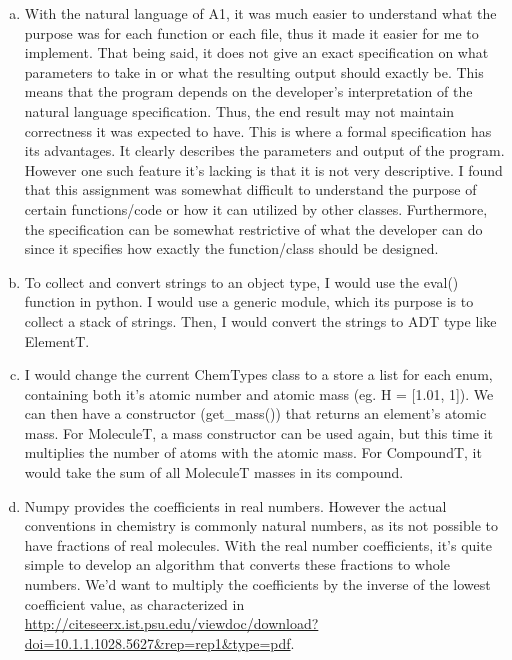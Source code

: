 \documentclass[12pt]{article}
\begin{document}
\begin{enumerate}[a)]

\item
With the natural language of A1, it was much easier to understand what the purpose was for each function or each file, thus it made it easier for me to implement. That being said, it does not give an exact specification on what parameters to take in or what the resulting output should exactly be. This means that the program depends on the developer's interpretation of the natural language specification. Thus, the end result may not maintain correctness it was expected to have. 
\newline
This is where a formal specification has its advantages. It clearly describes the parameters and output of the program. However one such feature it's lacking is that it is not very descriptive. I found that this assignment was somewhat difficult to understand the purpose of certain functions/code or how it can utilized by other classes. Furthermore, the specification can be somewhat restrictive of what the developer can do since it specifies how exactly the function/class should be designed.   

\item
To collect and convert strings to an object type, I would use the eval() function in python. I would use a generic module, which its purpose is to collect a stack of strings. Then, I would convert the strings to ADT type like ElementT. 

\item
I would change the current ChemTypes class to a store a list for each enum, containing both it's atomic number and atomic mass (eg. H = [1.01, 1]). We can then have a constructor (get\_mass()) that returns an element's atomic mass. For MoleculeT, a mass constructor can be used again, but this time it multiplies the number of atoms with the atomic mass. For CompoundT, it would take the sum of all MoleculeT masses in its compound.

\item
Numpy provides the coefficients in real numbers. However the actual conventions in chemistry is commonly natural numbers, as its not possible to have fractions of real molecules. With the real number coefficients, it's quite simple to develop an algorithm that converts these fractions to whole numbers. We'd want to multiply the coefficients by the inverse of the lowest coefficient value, as characterized in \url{http://citeseerx.ist.psu.edu/viewdoc/download?doi=10.1.1.1028.5627&rep=rep1&type=pdf}. 


\end{enumerate}
\end{document}
